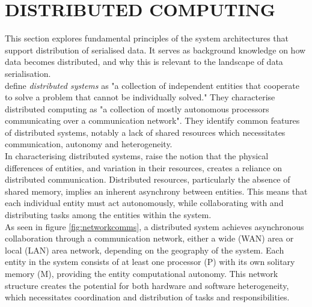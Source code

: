 \documentclass[../report.tex]{subfiles}
\begin{document}
\section{DISTRIBUTED COMPUTING}

This section explores fundamental principles of the system architectures that support distribution of serialised data. It serves as background knowledge on how data becomes distributed, and why this is relevant to the landscape of data serialisation. \\

\cite{kshemkalyani2011distributed} define \textit{distributed systems} as "a collection of independent entities that cooperate to solve a problem that cannot be individually solved." They characterise distributed computing as  "a collection of mostly autonomous processors communicating over a communication network". They identify common features of distributed systems, notably a lack of shared resources which necessitates communication, autonomy and heterogeneity. \\

In characterising distributed systems, \cite{kshemkalyani2011distributed} raise the notion that the physical differences of entities, and variation in their resources, creates a reliance on distributed communication. Distributed resources, particularly the absence of shared memory, implies an inherent asynchrony between entities. This means that each individual entity must act autonomously, while collaborating with and distributing tasks among the entities within the system. \\

As seen in figure \ref{fig:networkcomms}, a distributed system achieves asynchronous collaboration through a communication network, either a wide (WAN) area or local (LAN) area network, depending on the geography of the system. Each entity in the system consists of at least one processor (P) with its own solitary memory (M), providing the entity computational autonomy. This network structure creates the potential for both hardware and software heterogeneity, which necessitates coordination and distribution of tasks and responsibilities.
\end{document}
